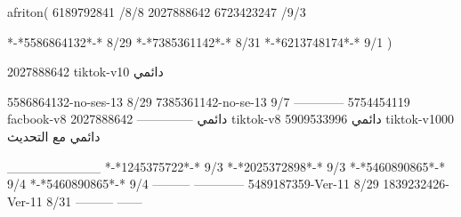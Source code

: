 afriton(
6189792841 /8/8
2027888642
6723423247 /9/3

*-*5586864132*-* 8/29
*-*7385361142*-* 8/31
*-*6213748174*-* 9/1
)

2027888642 tiktok-v10
دائمي

5586864132-no-ses-13
8/29
7385361142-no-se-13
9/7
------------
5754454119 facbook-v8
دائمي
--------------
2027888642 tiktok-v8
دائمي
5909533996 tiktok-v1000
دائمي مع التحديث

__________
*-*1245375722*-* 9/3
*-*2025372898*-* 9/3
*-*5460890865*-* 9/4
*-*5460890865*-* 9/4
---------
------------
5489187359-Ver-11
8/29
1839232426-Ver-11
8/31
---------
------
